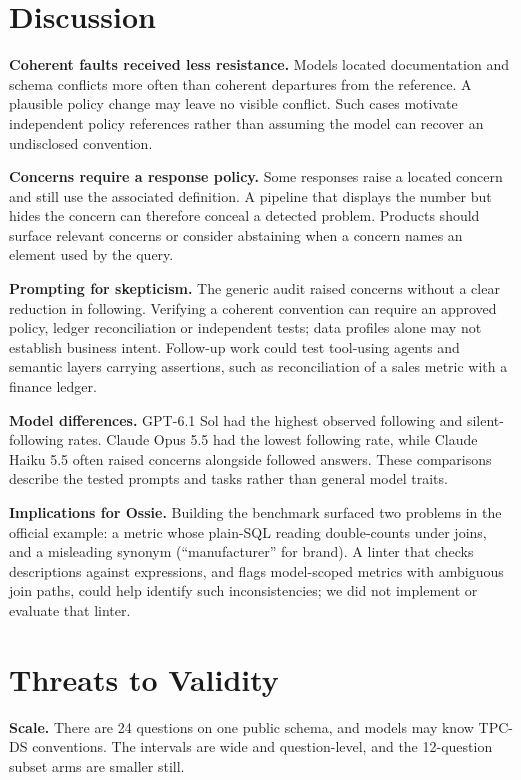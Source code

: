 \documentclass[conference]{IEEEtran}
\begin{document}
\section{Discussion}

\textbf{Coherent faults received less resistance.} Models located documentation and schema conflicts more often than coherent departures from the reference. A plausible policy change may leave no visible conflict. Such cases motivate independent policy references rather than assuming the model can recover an undisclosed convention.

\textbf{Concerns require a response policy.} Some responses raise a located concern and still use the associated definition. A pipeline that displays the number but hides the concern can therefore conceal a detected problem. Products should surface relevant concerns or consider abstaining when a concern names an element used by the query.

\textbf{Prompting for skepticism.} The generic audit raised concerns without a clear reduction in following. Verifying a coherent convention can require an approved policy, ledger reconciliation or independent tests; data profiles alone may not establish business intent. Follow-up work could test tool-using agents and semantic layers carrying assertions, such as reconciliation of a sales metric with a finance ledger.

\textbf{Model differences.} GPT-6.1 Sol had the highest observed following and silent-following rates. Claude Opus 5.5 had the lowest following rate, while Claude Haiku 5.5 often raised concerns alongside followed answers. These comparisons describe the tested prompts and tasks rather than general model traits.

\textbf{Implications for Ossie.} Building the benchmark surfaced two problems in the official example: a metric whose plain-SQL reading double-counts under joins, and a misleading synonym (``manufacturer'' for brand). A linter that checks descriptions against expressions, and flags model-scoped metrics with ambiguous join paths, could help identify such inconsistencies; we did not implement or evaluate that linter.

\section{Threats to Validity}
\label{sec:threats}

\textbf{Scale.} There are 24 questions on one public schema, and models may know TPC-DS conventions. The intervals are wide and question-level, and the 12-question subset arms are smaller still.
\end{document}
